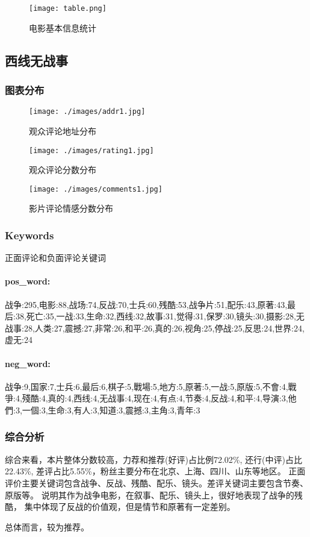 \documentclass[12pt]{article}
\begin{document}
\begin{figure}[h]
    \centering
    \texttt{[image: table.png]}
    \caption{电影基本信息统计}
\end{figure}

    
\subsection{西线无战事}
\subsubsection{图表分布}
\begin{figure}[H]
    \centering
    \begin{minipage}[t]{0.48\textwidth}
    \centering
    \texttt{[image: ./images/addr1.jpg]}
    \caption{观众评论地址分布}
    \end{minipage}
    \begin{minipage}[t]{0.48\textwidth}
    \centering
    \texttt{[image: ./images/rating1.jpg]}
    \caption{观众评论分数分布}
    \end{minipage}
\end{figure}

\begin{figure}[H]
    \centering
    \texttt{[image: ./images/comments1.jpg]}
    \caption{影片评论情感分数分布} 
\end{figure}

\subsubsection{Keywords}
正面评论和负面评论关键词
\paragraph{pos\_word:}
战争:295,电影:88,战场:74,反战:70,士兵:60,残酷:53,战争片:51,配乐:43,原著:43,最后:38,死亡:35,一战:33,生命:32,西线:32,故事:31,觉得:31,保罗:30,镜头:30,摄影:28,无战事:28,人类:27,震撼:27,非常:26,和平:26,真的:26,视角:25,停战:25,反思:24,世界:24,虚无:24
\paragraph*{neg\_word:}
战争:9,国家:7,士兵:6,最后:6,棋子:5,戰場:5,地方:5,原著:5,一战:5,原版:5,不會:4,戰爭:4,殘酷:4,真的:4,西线:4,无战事:4,现在:4,有点:4,节奏:4,反战:4,和平:4,导演:3,他們:3,一個:3,生命:3,有人:3,知道:3,震撼:3,主角:3,青年:3

\subsubsection{综合分析}
综合来看，本片整体分数较高，力荐和推荐(好评)占比例72.02\%, 还行(中评)占比22.43\%,
差评占比5.55\%，粉丝主要分布在北京、上海、四川、山东等地区。
正面评价主要关键词包含战争、反战、残酷、配乐、镜头。差评关键词主要包含节奏、原版等。
说明其作为战争电影，在叙事、配乐、镜头上，很好地表现了战争的残酷，
集中体现了反战的价值观，但是情节和原著有一定差别。
\par
总体而言，较为推荐。
\end{document}
